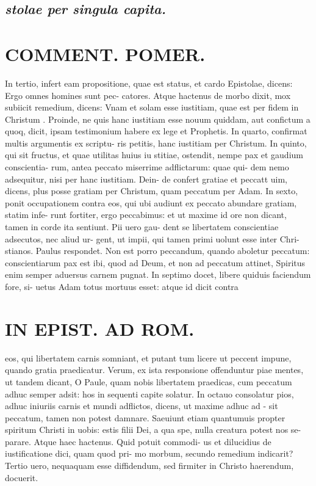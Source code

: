\documentclass{article}
\begin{document}
\begin{pages}
\subsection*{\textit{stolae per singula capita.  }}
\section*{COMMENT. POMER.  }
\marginpar{[ p.III ]}
\marginpar{[ p.IIII ]}
\marginpar{[ p.V ]}
\marginpar{[ p.VI ]}
\marginpar{[ p.VII ]}\pstart In tertio, infert eam propositione, quae est status, et cardo Epistolae, dicens: Ergo omnes homines sunt pec- catores. Atque hactenus de morbo dixit, mox subiicit remedium, dicens: Vnam et solam esse iustitiam, quae est per fidem in Christum . Proinde, ne quis hanc iustitiam esse nouum quiddam, aut confictum a quoq, dicit, ipsam testimonium habere ex lege et Prophetis.   \pend\pstart In quarto, confirmat multis argumentis ex scriptu- ris petitis, hanc iustitiam per Christum.  In quinto, qui sit fructus, et quae utilitas huius iu stitiae, ostendit, nempe pax et gaudium conscientia- rum, antea peccato miserrime adflictarum: quae qui- dem nemo adsequitur, nisi per hanc iustitiam. Dein- de confert gratiae et peccatt uim, dicens, plus posse gratiam per Christum, quam peccatum per Adam.  In sexto, ponit occupationem contra eos, qui ubi audiunt ex peccato abundare gratiam, statim infe- runt fortiter, ergo peccabimus: et ut maxime id ore non dicant, tamen in corde ita sentiunt. Pii uero gau- dent se libertatem conscientiae adsecutos, nec aliud ur- gent, ut impii, qui tamen primi uolunt esse inter Chri- stianos. Paulus respondet. Non est porro peccandum, quando aboletur peccatum: conscientiarum pax est ibi, quod ad Deum, et non ad peccatum attinet, Spiritus enim semper aduersus carnem pugnat.   \pend\pstart In septimo docet, libere quiduis faciendum fore, si- uetus Adam totus mortuus esset: atque id dicit contra  \pend
\section*{IN EPIST. AD ROM.  }
\marginpar{[ p.8 ]}
\marginpar{[ p.VIII ]}\pstart eos, qui libertatem carnis somniant, et putant tum licere ut peccent impune, quando gratia praedicatur.  Verum, ex ista responsione offenduntur piae mentes, ut tandem dicant, O Paule, quam nobis libertatem praedicas, cum peccatum adhuc semper adsit: hos in sequenti capite solatur.   \pend\pstart In octauo consolatur pios, adhuc iniuriis carnis et mundi adflictos, dicens, ut maxime adhuc ad - sit peccatum, tamen non potest damnare. Saeuiunt etiam quantumuis propter spiritum Christi in uobis: estis filii Dei, a qua spe, nulla creatura potest nos se- parare. Atque haec hactenus. Quid potuit commodi- us et dilucidius de iustificatione dici, quam quod pri- mo morbum, secundo remedium indicarit? Tertio uero, nequaquam esse diffidendum, sed firmiter in Christo haerendum, docuerit.   \pend
{}
{}

\end{pages}
\end{document}
